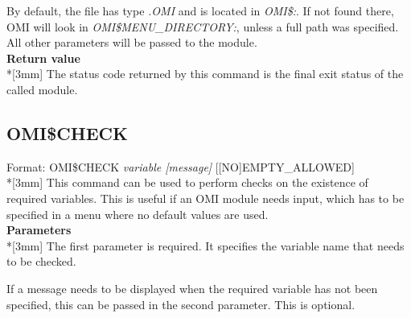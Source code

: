 \documentclass[a4paper]{book}
\renewcommand{\indent}{\hspace*{5mm}}
\begin{document}
By default, the file has type \textsl{.OMI} and is located in \textsl{OMI{\$}:}. If not found 
there, OMI will look in \textsl{OMI{\$}MENU{\_}DIRECTORY:}, unless a full path was 
specified. \\
All other parameters will be passed to the module.\\[3mm]
\textbf{Return value}\\*[3mm]
The status code returned by this command is the final exit status of the 
called module.

\subsection{OMI{\$}CHECK}
\label{subsubsec:mylabel44}

\indent Format: \textsf{OMI{\$}CHECK \textit{variable [message]} [[NO]EMPTY{\_}ALLOWED]}\\*[3mm]
This command can be used to perform checks on the existence of required 
variables. This is useful if an OMI module needs input, which has to be 
specified in a menu where no default values are used.\\[3mm]
\textbf{Parameters}\\*[3mm]
The first parameter is required. It specifies the variable name that needs 
to be checked.

If a message needs to be displayed when the required variable has not been 
specified, this can be passed in the second parameter. This is optional.
\end{document}
